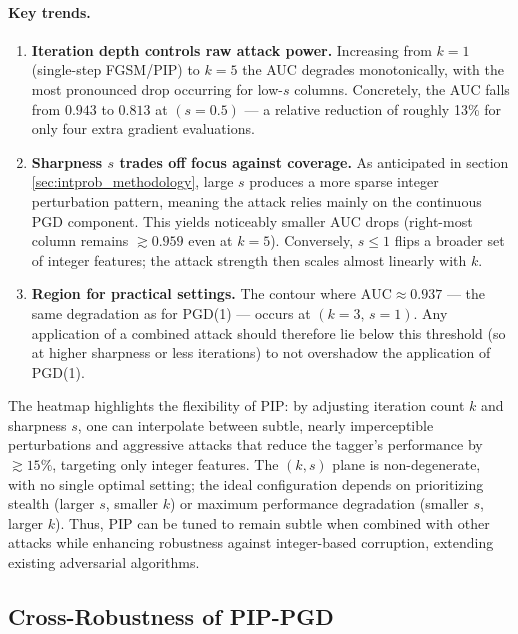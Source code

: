 \paragraph{Key trends.}
\begin{enumerate}
  \item \textbf{Iteration depth controls raw attack power.}  
        Increasing from $k=1$ (single-step FGSM/PIP) to $k=5$ the AUC degrades monotonically, with the most pronounced drop occurring for low-$s$ columns.  Concretely, the AUC falls from $0.943$ to $0.813$ at
        $(s{=}0.5)$ — a relative reduction of roughly 13\% for only four extra gradient evaluations.
  \item \textbf{Sharpness $s$ trades off focus against coverage.}
        As anticipated in section \ref{sec:intprob_methodology}, large $s$ produces a more sparse integer perturbation pattern, meaning the attack relies mainly on the continuous PGD component. This yields noticeably smaller AUC drops (right-most column remains ${\gtrsim}0.959$ even at $k{=}5$).
        Conversely, $s\!\le\!1$ flips a broader set of integer features; the
        attack strength then scales almost linearly with $k$.
  \item \textbf{Region for practical settings.}  
        The contour where $\text{AUC}\!\approx\!0.937$ — the same degradation as for PGD(1) — occurs at $(k{=}3,\,s{=}1)$. Any application of a combined attack should therefore lie below this threshold (so at higher sharpness or less iterations) to not overshadow the application of PGD(1).
\end{enumerate}

The heatmap highlights the flexibility of PIP: by adjusting iteration count $k$ and sharpness $s$, one can interpolate between subtle, nearly imperceptible perturbations and aggressive attacks that reduce the tagger’s performance by $\gtrsim15\%$, targeting only integer features. The $(k,s)$ plane is non-degenerate, with no single optimal setting; the ideal configuration depends on prioritizing stealth (larger $s$, smaller $k$) or maximum performance degradation (smaller $s$, larger $k$). Thus, PIP can be tuned to remain subtle when combined with other attacks while enhancing robustness against integer-based corruption, extending existing adversarial algorithms.

\subsection{Cross-Robustness of PIP-PGD}

